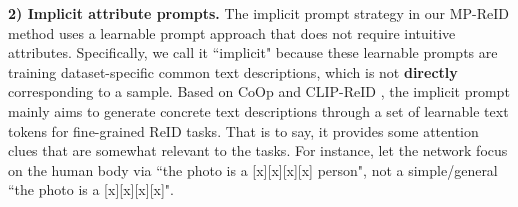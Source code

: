 \documentclass[letterpaper]{article} %
\begin{document}
\textbf{2) Implicit attribute prompts.}
The implicit prompt strategy in our MP-ReID method uses a learnable prompt approach that does not require intuitive attributes. Specifically, we call it ``implicit" because these learnable prompts are training dataset-specific common text descriptions, which is not \textbf{directly} corresponding to a sample. Based on CoOp \cite{zhou2022learning,zhou2022conditional} and CLIP-ReID \cite{li2022clip}, the implicit prompt mainly aims to generate concrete text descriptions through a set of learnable text tokens for fine-grained ReID tasks. That is to say, it provides some attention clues that are somewhat relevant to the tasks. For instance, let the network focus on the human body via ``the photo is a [x][x][x][x] person", not a simple/general ``the photo is a [x][x][x][x]".

\begin{table}[]
\centering
    \label{tab:sotas}
    \renewcommand{\arraystretch}{1.1}
\end{table}
\end{document}
